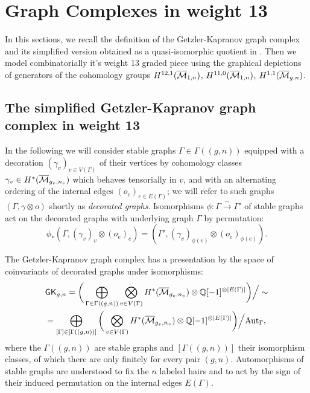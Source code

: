 

\section{Graph Complexes in weight 13}

In this sections, we recall the definition of the Getzler-Kapranov graph complex and its simplified version obtained as a quasi-isomorphic quotient in \cite{CLPW2}. Then we model combinatorially it's weight 13 graded piece using the graphical depictions of generators of the cohomology groups $H^{12,1}(\overline{\mathcal{M}}_{1,n})$, $H^{11,0}(\overline{\mathcal{M}}_{1,n})$, $H^{1,1}(\overline{\mathcal{M}}_{g,n})$.

\subsection{The simplified Getzler-Kapranov graph complex in weight 13}
In the following we will consider stable graphs $\Gamma\in\Gamma((g,n))$ equipped with a decoration $(\gamma_v)_{v\in V(\Gamma)}$ of their vertices by cohomology classes $\gamma_v \in H^{*}(\overline{\mathcal{M}}_{g_v,n_v})$ which behaves tensorially in $v$, and with an alternating ordering of the internal edges $(o_e)_{e\in E(\Gamma)}$; we will refer to such graphs $(\Gamma,\gamma\otimes o)$ shortly as \emph{decorated graphs}. Isomorphisms $\phi:\Gamma\xrightarrow{\sim}\Gamma'$ of stable graphs act on the decorated graphs with underlying graph $\Gamma$ by permutation:
\[ \phi_* (\Gamma,(\gamma_v)_{v}\otimes (o_e)_{e}) = (\Gamma',(\gamma_v)_{\phi(v)}\otimes (o_e)_{\phi(e)}). \]

The Getzler-Kapranov graph complex has a presentation by the space of coinvariants of decorated graphs under isomorphisms:
\begin{multline}\label{equ:GKdef}
    \mathsf{GK}_{g,n} = 
    \bigg( \bigoplus_{\Gamma\in\Gamma((g,n))} \bigotimes_{v\in V(\Gamma)}H^{*}(\overline{\mathcal{M}}_{g_v,n_v})\otimes \mathbb{Q}[-1]^{\otimes |E(\Gamma)|} \bigg) \Big/ \sim \\
    = \bigoplus_{[\Gamma]\in[\Gamma((g,n))]} \bigg(
    \bigotimes_{v\in V(\Gamma)}H^{*}(\overline{\mathcal{M}}_{g_v,n_v})\otimes \mathbb{Q}[-1]^{\otimes |E(\Gamma)|} \bigg) \Big/ \text{Aut}_{\Gamma},
\end{multline}
where the $\Gamma((g,n))$ are stable graphs and $[\Gamma((g,n))]$ their isomorphism classes, of which there are only finitely for every pair $(g,n)$. Automorphisms of stable graphs are understood to fix the $n$ labeled hairs and to act by the sign of their induced permutation on the internal edges $E(\Gamma)$.


